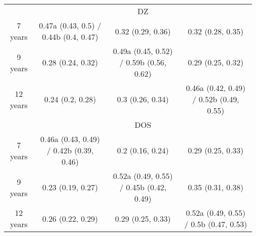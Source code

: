 \begin{tabular}{ccccc}
  \cmidrule{1-4}          & \multicolumn{4}{c}{DZ} \\
  7 years & \multicolumn{2}{c}{0.47a (0.43, 0.5) / 0.44b (0.4, 0.47)} & 0.32 (0.29, 0.36) & 0.32 (0.28, 0.35) \\
  9 years & \multicolumn{2}{c}{0.28 (0.24, 0.32)} & 0.49a (0.45, 0.52) / 0.59b (0.56, 0.62) & 0.29 (0.25, 0.32) \\
  12 years & \multicolumn{2}{c}{0.24 (0.2, 0.28)} & 0.3 (0.26, 0.34) & 0.46a (0.42, 0.49) / 0.52b (0.49, 0.55) \\
  \cmidrule{1-4}          & \multicolumn{4}{c}{DOS} \\
  7 years & \multicolumn{2}{c}{0.46a (0.43, 0.49) / 0.42b (0.39, 0.46)} & 0.2 (0.16, 0.24) & 0.29 (0.25, 0.33) \\
  9 years & \multicolumn{2}{c}{0.23 (0.19, 0.27)} & 0.52a (0.49, 0.55) / 0.45b (0.42, 0.49) & 0.35 (0.31, 0.38) \\
  12 years & \multicolumn{2}{c}{0.26 (0.22, 0.29)} & 0.29 (0.25, 0.33) & 0.52a (0.49, 0.55) / 0.5b (0.47, 0.53) \\
  \bottomrule
\end{tabular}%
